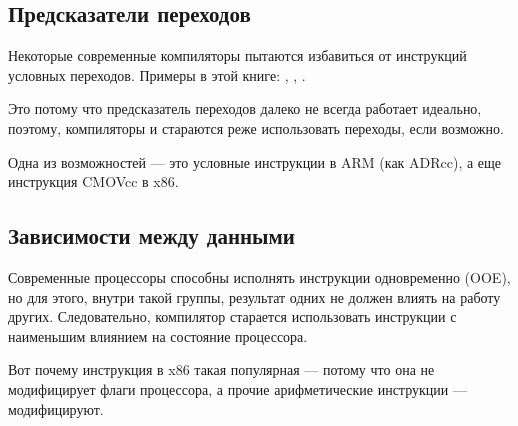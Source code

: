 ﻿

\subsection{Предсказатели переходов}
\label{branch_predictors}

Некоторые современные компиляторы пытаются избавиться от инструкций условных переходов.
Примеры в этой книге: , , .

Это потому что предсказатель переходов далеко не всегда работает идеально, поэтому, компиляторы и стараются
реже использовать переходы, если возможно.

Одна из возможностей --- это условные инструкции в ARM (как ADRcc), а еще инструкция CMOVcc в x86.

\subsection{Зависимости между данными}

Современные процессоры способны исполнять инструкции одновременно (\ac{OOE}), но для этого,
внутри такой группы, результат одних не должен влиять на работу других.
Следовательно, компилятор старается использовать инструкции с наименьшим влиянием на состояние процессора.

Вот почему инструкция \LEA в x86 такая популярная --- 
потому что она не модифицирует флаги процессора,
а прочие арифметические инструкции --- модифицируют.

